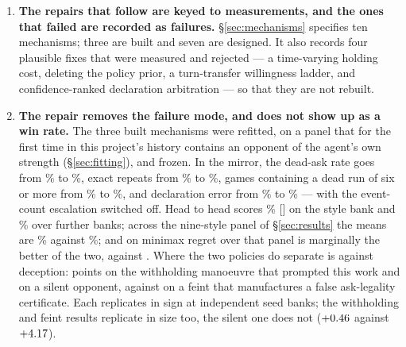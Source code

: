 \begin{enumerate}
        cashes a best candidate without inspecting its probability at all, costs
        \numStageTwoCost{} points against a mirror opponent and exactly nothing
        against every weaker style tested. Both settings of the dial are bad; the
        missing capability is an ask rule that terminates the cycle by choosing
        informative asks rather than an event counter that ends the game by
        guessing.
  \item \textbf{The repairs that follow are keyed to measurements, and the ones
        that failed are recorded as failures.} \S\ref{sec:mechanisms} specifies
        ten mechanisms; three are built and seven are designed. It also records
        four plausible fixes that were measured and rejected --- a time-varying
        holding cost, deleting the policy prior, a turn-transfer willingness
        ladder, and confidence-ranked declaration arbitration --- so that they
        are not rebuilt.
  \item \textbf{The repair removes the failure mode, and does not show up as a
        win rate.} The three built mechanisms were refitted, on a panel that for
        the first time in this project's history contains an opponent of the
        agent's own strength (\S\ref{sec:fitting}), and frozen. In the mirror,
        the dead-ask rate goes from \numFourDeadAsk\% to \numFiveDeadAsk\%, exact
        repeats from \numFourRepeatAsk\% to \numFiveRepeatAsk\%, games containing
        a dead run of six or more from \numFourDeadRunGames\% to
        \numFiveDeadRunGames\%, and declaration error from \numFourDeclWrong\% to
        \numFiveDeclWrong\% --- with the event-count escalation switched off.
        Head to head \vfive{} scores
        \numPanelVfiveVfour\% [\numStyleCIVfour] on the style bank and
        \numHeadWin\% over \numHeadSeeds{} further banks; across the nine-style panel of
        \S\ref{sec:results} the means are \numVfiveMean\% against
        \numVfourMean\%; and on minimax regret over that panel \vfour{} is
        marginally the better of the two, \numVfourRegret{} against
        \numVfiveRegret{}. Where the two policies do separate is against
        deception: \numDecWithholderDelta{} points on the withholding manoeuvre
        that prompted this work and \numDecSilentDelta{} on a silent opponent,
        against \numDecFeintDelta{} on a feint that manufactures a false
        ask-legality certificate. Each replicates in sign at \numDecSeeds{}
        independent seed banks; the withholding and feint results replicate in
        size too, the silent one does not ($+0.46$ against
        $+4.17$).
\end{enumerate}

